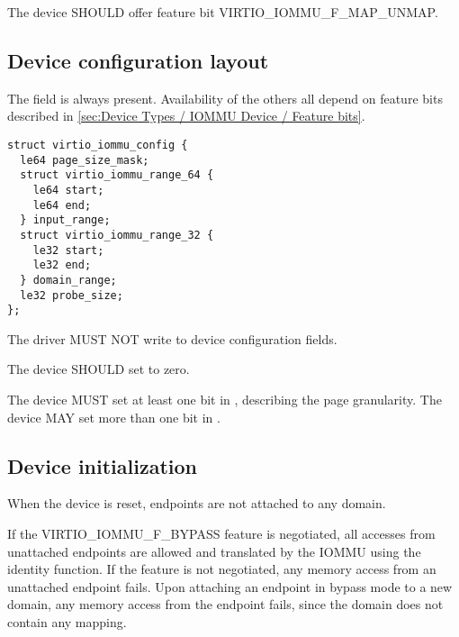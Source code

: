The device SHOULD offer feature bit VIRTIO_IOMMU_F_MAP_UNMAP.

\subsection{Device configuration layout}\label{sec:Device Types / IOMMU Device / Device configuration layout}

The  field is always present. Availability of the
others all depend on feature bits described in
\ref{sec:Device Types / IOMMU Device / Feature bits}.

\begin{lstlisting}
struct virtio_iommu_config {
  le64 page_size_mask;
  struct virtio_iommu_range_64 {
    le64 start;
    le64 end;
  } input_range;
  struct virtio_iommu_range_32 {
    le32 start;
    le32 end;
  } domain_range;
  le32 probe_size;
};
\end{lstlisting}


The driver MUST NOT write to device configuration fields.


The device SHOULD set  to zero.

The device MUST set at least one bit in , describing
the page granularity. The device MAY set more than one bit in
.

\subsection{Device initialization}\label{sec:Device Types / IOMMU Device / Device initialization}

When the device is reset, endpoints are not attached to any domain.

If the VIRTIO_IOMMU_F_BYPASS feature is negotiated, all accesses from
unattached endpoints are allowed and translated by the IOMMU using the
identity function. If the feature is not negotiated, any memory access
from an unattached endpoint fails. Upon attaching an endpoint in
bypass mode to a new domain, any memory access from the endpoint fails,
since the domain does not contain any mapping.

